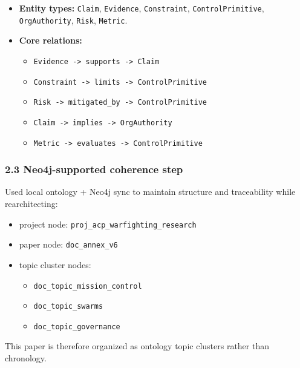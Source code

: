 \documentclass[11pt]{article}
\begin{document}
\begin{itemize}
\tightlist
\item
  \textbf{Entity types:} \texttt{Claim}, \texttt{Evidence},
  \texttt{Constraint}, \texttt{ControlPrimitive}, \texttt{OrgAuthority},
  \texttt{Risk}, \texttt{Metric}.
\item
  \textbf{Core relations:}

  \begin{itemize}
  \tightlist
  \item
    \texttt{Evidence\ -\textgreater{}\ supports\ -\textgreater{}\ Claim}
  \item
    \texttt{Constraint\ -\textgreater{}\ limits\ -\textgreater{}\ ControlPrimitive}
  \item
    \texttt{Risk\ -\textgreater{}\ mitigated\_by\ -\textgreater{}\ ControlPrimitive}
  \item
    \texttt{Claim\ -\textgreater{}\ implies\ -\textgreater{}\ OrgAuthority}
  \item
    \texttt{Metric\ -\textgreater{}\ evaluates\ -\textgreater{}\ ControlPrimitive}
  \end{itemize}
\end{itemize}

\hypertarget{neo4j-supported-coherence-step}{%
\subsubsection{2.3 Neo4j-supported coherence
step}\label{neo4j-supported-coherence-step}}

Used local ontology + Neo4j sync to maintain structure and traceability
while rearchitecting:

\begin{itemize}
\tightlist
\item
  project node: \texttt{proj\_acp\_warfighting\_research}
\item
  paper node: \texttt{doc\_annex\_v6}
\item
  topic cluster nodes:

  \begin{itemize}
  \tightlist
  \item
    \texttt{doc\_topic\_mission\_control}
  \item
    \texttt{doc\_topic\_swarms}
  \item
    \texttt{doc\_topic\_governance}
  \end{itemize}
\end{itemize}

This paper is therefore organized as ontology topic clusters rather than
chronology.
\end{document}

